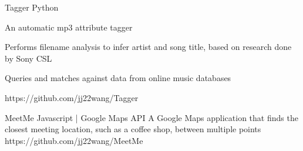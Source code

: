 



\begin{cvprojects}

\cvproject
{Tagger}
{Python}
{
An automatic mp3 attribute tagger
\begin{cvitems}
\item[]
\item {Performs filename analysis to infer artist and song title, based on research done by Sony CSL}
\item {Queries and matches against data from online music databases}
\end{cvitems}
}
{https://github.com/jj22wang/Tagger}


\cvproject
{MeetMe}
{Javascript | Google Maps API}
{
A Google Maps application that finds the closest meeting location, such as a coffee shop, between multiple points
}
{https://github.com/jj22wang/MeetMe}

\end{cvprojects}
